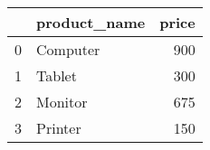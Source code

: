 \begin{tabular}{llr}
\toprule
 & product_name & price \\
\midrule
0 & Computer & 900 \\
1 & Tablet & 300 \\
2 & Monitor & 675 \\
3 & Printer & 150 \\
\bottomrule
\end{tabular}
